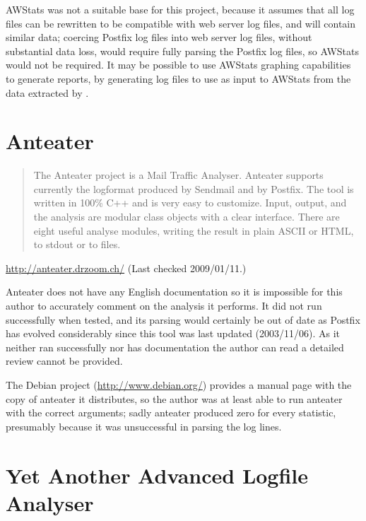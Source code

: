 AWStats was not a suitable base for this project, because it assumes that
all log files can be rewritten to be compatible with web server log files,
and will contain similar data; coercing Postfix log files into web server
log files, without substantial data loss, would require fully parsing the
Postfix log files, so AWStats would not be required.  It may be possible to
use AWStats graphing capabilities to generate reports, by generating log
files to use as input to AWStats from the data extracted by \parsername{}.

\section{Anteater}

\begin{quotation}

    The Anteater project is a Mail Traffic Analyser. Anteater supports
    currently the logformat produced by Sendmail and by Postfix. The tool
    is written in 100\% C++ and is very easy to customize. Input, output,
    and the analysis are modular class objects with a clear interface.
    There are eight useful analyse modules, writing the result in plain
    ASCII or HTML, to stdout or to files.

\end{quotation}

\noindent{}\url{http://anteater.drzoom.ch/} \newline{}
(Last checked 2009/01/11.)

Anteater does not have any English documentation so it is impossible for
this author to accurately comment on the analysis it performs.  It did not
run successfully when tested, and its parsing would certainly be out of
date as Postfix has evolved considerably since this tool was last updated
(2003/11/06).  As it neither ran successfully nor has documentation the
author can read a detailed review cannot be provided.

The Debian project (\url{http://www.debian.org/}) provides a manual page
with the copy of anteater it distributes, so the author was at least able
to run anteater with the correct arguments; sadly anteater produced zero
for every statistic, presumably because it was unsuccessful in parsing the
log lines.

\section{Yet Another Advanced Logfile Analyser}

